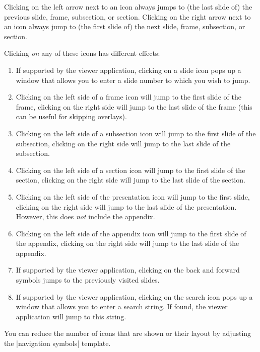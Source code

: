 Clicking on the left arrow next to an icon always jumps to (the
last slide of) the previous slide, frame, subsection, or
section. Clicking on the right arrow next to an icon always jump to
(the first slide of) the next slide, frame, subsection, or section. 

Clicking \emph{on} any of these icons has different effects:
\begin{enumerate}
\item
  If supported by the viewer application, clicking on a slide icon
  pops up a window that allows you to enter a slide number to which
  you wish to jump.
\item
  Clicking on the left side of a frame icon will jump to the first
  slide of the frame, clicking on the right side will jump to the last
  slide of the frame (this can be useful for skipping overlays).
\item
  Clicking on the left side of a subsection icon will jump to the
  first slide of the subsection, clicking on the right side will jump
  to the last slide of the subsection.
\item
  Clicking on the left side of a section icon will jump to the
  first slide of the section, clicking on the right side will jump
  to the last slide of the section.
\item
  Clicking on the left side of the presentation icon will jump to the
  first slide, clicking on the right side will jump to the last slide
  of the presentation. However, this does \emph{not} include the
  appendix. 
\item
  Clicking on the left side of the appendix icon will jump to the
  first slide of the appendix, clicking on the right side will jump to
  the last slide of the appendix.
\item
  If supported by the viewer application, clicking on the back and
  forward symbols jumps to the previously visited slides.
\item
  If supported by the viewer application, clicking on the search icon
  pops up a window that allows you to enter a search string. If found,
  the viewer application will jump to this string.
\end{enumerate}

You can reduce the number of icons that are shown or their layout by
adjusting the |navigation symbols| template.

